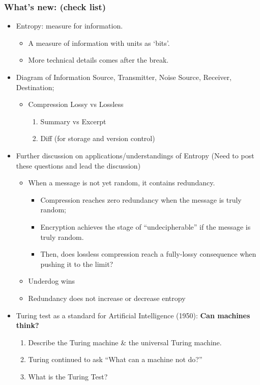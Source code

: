 \documentclass[12pt]{article}
\theoremstyle{definition}
\theoremstyle{plain}
\begin{document}
\subsubsection{What's new: (check list)}
\begin{itemize}
    \item Entropy: measure for information.
        \begin{itemize}
            \item A measure of information with units as `bits'.
            \item More technical details comes after the break. %

        \end{itemize}
    \item Diagram of Information Source, Transmitter, Noise Source, Receiver,
        Destination;
        \begin{itemize}
            \item Compression Lossy vs Lossless
                \begin{enumerate}
                    \item  Summary vs Excerpt
                    \item Diff (for storage and version control)
                \end{enumerate}
        \end{itemize}
    \item Further discussion on applications/understandings of Entropy (Need to
        post these questions and lead the discussion)
        \newpage
        \begin{itemize}
            \item When a message is not yet random, it contains redundancy.
                \begin{itemize}
                    \item Compression reaches zero redundancy when the message
                        is truly random;
                    \item Encryption achieves the stage of ``undecipherable'' if
                        the message is truly random.
                    \item Then, does lossless compression reach a fully-lossy
                        consequence when pushing it to the limit?
                \end{itemize}
            \item {Underdog wins}
            \item {Redundancy does not increase or decrease entropy}
        \end{itemize}
    \item Turing test as a standard for Artificial Intelligence (1950):
        \textbf{Can machines think?}
        \begin{enumerate}
            \item Describe the Turing machine & the universal Turing machine.
            \item Turing continued to ask “What can a machine not do?”
            \item What is the Turing Test?
        \end{enumerate}
\end{itemize}
\end{document}
